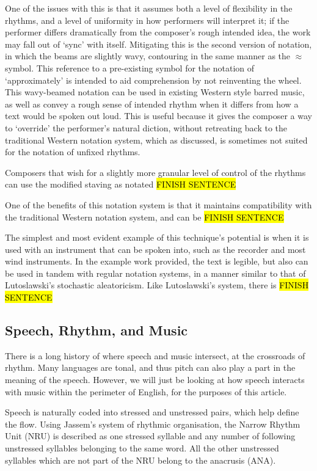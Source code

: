 One of the issues with this is that it assumes both a level of flexibility in the rhythms, and a level of uniformity in how performers will interpret it; if the performer differs dramatically from the composer's rough intended idea, the work may fall out of `sync' with itself.
Mitigating this is the second version of notation, in which the beams are slightly wavy, contouring in the same manner as the \(\approx{}\) symbol. 
This reference to a pre-existing symbol for the notation of `approximately' is intended to aid comprehension by not reinventing the wheel.
This wavy-beamed notation can be used in existing Western style barred music, as well as convey a rough sense of intended rhythm when it differs from how a text would be spoken out loud.
This is useful because it gives the composer a way to `override' the performer's natural diction, without retreating back to the traditional Western notation system, which as discussed, is sometimes not suited for the notation of unfixed rhythms.

Composers that wish for a slightly more granular level of control of the rhythms can use the modified staving as notated \hl{FINISH SENTENCE}

One of the benefits of this notation system is that it maintains compatibility with the traditional Western notation system, and can be \hl{FINISH SENTENCE}

The simplest and most evident example of this technique's potential is when it is used with an instrument that can be spoken into, such as the recorder and most wind instruments. 
In the example work provided, the text is legible, but also can be used in tandem with regular notation systems, in a manner similar to that of Lutoslawski's stochastic aleatoricism.\autocite[]{lutoslawski}
Like Lutoslawski's system, there is \hl{FINISH SENTENCE}

\subsection{Speech, Rhythm, and Music}
There is a long history of where speech and music intersect, at the crossroads of rhythm. 
Many languages are tonal, and thus pitch can also play a part in the meaning of the speech. 
However, we will just be looking at how speech interacts with music within the perimeter of English, for the purposes of this article. 

Speech is naturally coded into stressed and unstressed pairs, which help define the flow. 
Using Jassem's system of rhythmic organisation, the Narrow Rhythm Unit (NRU) is described as one stressed syllable and any number of following unstressed syllables belonging to the same word.\autocite[]{hillResultsPreliminaryStudy1977}
All the other unstressed syllables which are not part of the NRU belong to the anacrusis (ANA). 

